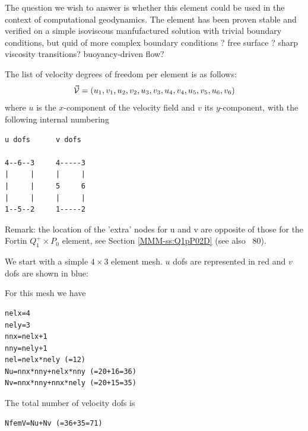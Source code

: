 The question we wish to answer is whether this element could be used 
in the context of computational geodynamics. 
The element has been proven stable and verified on a simple 
isoviscous manfufactured solution with trivial boundary conditions,
but quid of more complex boundary conditions ? free surface ? 
sharp viscosity transitions?  buoyancy-driven flow? 


The list of velocity degrees of freedom per element is as follows:
\[
\vec{\cal V} = (u_1,v_1,u_2,v_2,u_3,v_3,u_4,v_4,u_5,v_5,u_6,v_6)
\]
where $u$ is the $x$-component of the velocity field and $v$ its $y$-component,
with the following internal numbering
\begin{verbatim}
u dofs      v dofs

4--6--3     4-----3
|     |     |     |
|     |     5     6
|     |     |     |
1--5--2     1-----2
\end{verbatim}

Remark: the location of the 'extra' 
nodes for u and v are opposite of those for the Fortin $Q_1^+\times P_0$ element, see
Section \ref{MMM-ss:Q1pP02D} (see also \stone~80).

We start with a simple $4\times 3$ element mesh.
$u$ dofs are represented in red and $v$ dofs are shown in blue:





For this mesh we have 

\begin{lstlisting}
nelx=4
nely=3
nnx=nelx+1
nny=nely+1
nel=nelx*nely (=12) 
Nu=nnx*nny+nelx*nny (=20+16=36)
Nv=nnx*nny+nnx*nely (=20+15=35)
\end{lstlisting}

The total number of velocity dofs is 
\begin{lstlisting}
NfemV=Nu+Nv (=36+35=71)
\end{lstlisting}

